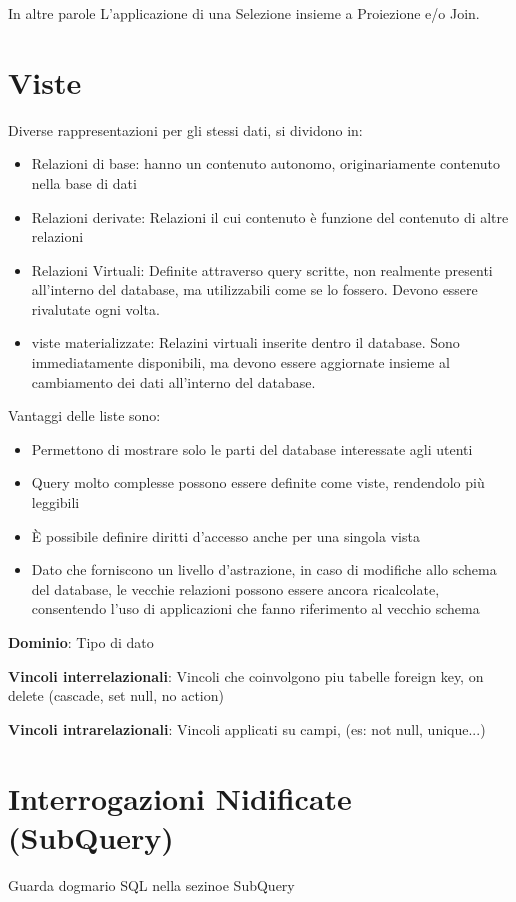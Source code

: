\documentclass{paper}
\begin{document}
In altre parole L'applicazione di una Selezione insieme a Proiezione e/o Join.

\section{Viste}
Diverse rappresentazioni per gli stessi dati, si dividono in:
\begin{itemize}
    \item Relazioni di base: hanno un contenuto autonomo, originariamente contenuto nella base di dati
    \item Relazioni derivate: Relazioni il cui contenuto è funzione del contenuto di altre relazioni
    \item Relazioni Virtuali: Definite attraverso query scritte, non realmente presenti all'interno del database, ma utilizzabili come se lo fossero. Devono essere rivalutate ogni volta.
    \item viste materializzate: Relazini virtuali inserite dentro il database. Sono immediatamente disponibili, ma devono essere aggiornate insieme al cambiamento dei dati all'interno del database.
\end{itemize}

Vantaggi delle liste sono:
\begin{itemize}
    \item Permettono di mostrare solo le parti del database interessate agli utenti
    \item Query molto complesse possono essere definite come viste, rendendolo più leggibili
    \item È possibile definire diritti d'accesso anche per una singola vista
    \item Dato che forniscono un livello d'astrazione, in caso di modifiche allo schema del database,
        le vecchie relazioni possono essere ancora ricalcolate, consentendo l'uso di applicazioni che
        fanno riferimento al vecchio schema
\end{itemize}

\textbf{Dominio}: Tipo di dato

\textbf{Vincoli interrelazionali}: Vincoli che coinvolgono piu tabelle foreign key, on delete (cascade, set null, no action)

\textbf{Vincoli intrarelazionali}: Vincoli applicati su campi, (es: not null, unique...)

\section{Interrogazioni Nidificate (SubQuery)}
Guarda dogmario SQL nella sezinoe SubQuery
\end{document}

